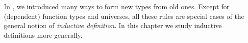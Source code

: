 \documentclass[12pt]{article}
\begin{document}
In ,  we introduced many ways to form new types from old ones.
Except for (dependent) function types and universes, all these rules are special cases of the general notion of \emph{inductive definition}.
In this chapter we study inductive definitions more generally.
\end{document}
